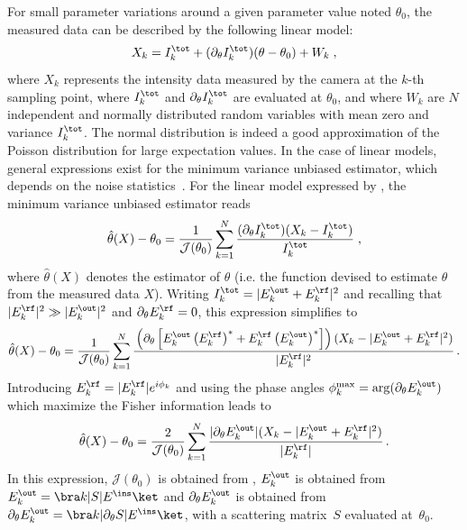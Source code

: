 \documentclass[aps,pra,twocolumn,amsmath,amssymb,superscriptaddress,10pt,nobibnotes]{revtex4-2}
\begin{document}
For small parameter variations around a given parameter value noted $\theta_0$, the measured data can be described by the following linear model:
\begin{equation}
X_k= I^{\tot}_k+ (\partial_\theta I^{\tot}_k ) (\theta-\theta_0) + W_k \; , 
\label{linear_model_intensity}
\end{equation}
where $X_k$ represents the intensity data measured by the camera at the $k$-th sampling point, where $I^{\tot}_k$ and $\partial_\theta I^{\tot}_k$ are evaluated at $\theta_0$, and where $W_k$ are $N$ independent and normally distributed random variables with mean zero and variance $I_k^{\tot}$. The normal distribution is indeed a good approximation of the Poisson distribution for large expectation values. In the case of linear models, general expressions exist for the minimum variance unbiased estimator, which depends on the noise statistics~\cite{kay_fundamentals_1993_1}. For the linear model expressed by , the minimum variance unbiased estimator reads
\begin{equation}
\hat{\theta}(X) -\theta_0 = \frac{1}{\mathcal{J}(\theta_0)} \sum_{k=1}^N \frac{(\partial_\theta I_k^{\tot})(X_k-I_k^{\tot}) }{I_k^{\tot}} \; ,
\end{equation}
where $\hat{\theta}(X)$ denotes the estimator of $\theta$ (i.e. the function devised to estimate $\theta$ from the measured data $X$). Writing $I_k^{\tot}=|E_k^\out+E_k^\rf|^2$ and recalling that $|E_k^\rf|^2 \gg |E_k^\out|^2$ and $\partial_\theta E_k^\rf=0$, this expression simplifies to 
\begin{equation}
\hat{\theta}(X) -\theta_0 = \frac{1}{\mathcal{J}(\theta_0)} \sum_{k=1}^N \cfrac{ \left(\partial_\theta \left[ E_k^\out \left(E_k^\rf\right)^* + E_k^\rf \left(E_k^\out\right)^* \right]\right) (X_k-|E_k^\out+E_k^\rf|^2) }{|E_k^\rf|^2} \; .
\end{equation}
Introducing $E_k^\rf=|E_k^\rf| e^{i \phi_k}$ and using the phase angles $\phi_k^\mathrm{max} = \arg (\partial_\theta E_k^\out)$ which maximize the Fisher information leads to
\begin{equation}
\hat{\theta}(X) -\theta_0 = \frac{2}{\mathcal{J}(\theta_0)} \sum_{k=1}^N \cfrac{ |\partial_\theta E_k^\out|(X_k-|E_k^\out+E_k^\rf|^2 ) }{|E_k^\rf| } \; .
\end{equation}
In this expression, $\mathcal{J}(\theta_0)$ is obtained from , $E_k^\out$ is obtained from $E_k^\out=\bra k |S|E^\ins\ket$ and $\partial_\theta E_k^\out$ is obtained from $\partial_\theta E_k^\out=\bra k |\partial_\theta S|E^\ins\ket$, with a scattering matrix~$S$ evaluated at~$\theta_0$.
\end{document}
